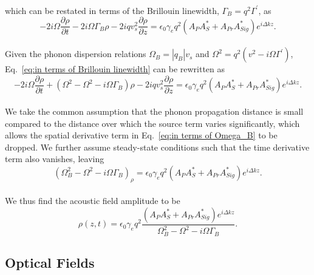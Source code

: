 \\
which can be restated in terms of the Brillouin linewidth, \(\Gamma_{B} = q^{2}\Gamma^{\prime}\), as
\\
\begin{equation}
    -2i\Omega\frac{\partial\rho}{\partial t} - 2i\Omega\Gamma_{B}\rho - 2iqv_{s}^{2}\frac{\partial\rho}{\partial z} = \epsilon_{0}\gamma_{e}q^{2}(A_{P}A_{S}^{*} + A_{Pr}A_{Sig}^{*})e^{i\Delta kz}.
    \label{eq:in terms of Brillouin linewidth}
\end{equation}
\\
Given the phonon dispersion relations \(\Omega_{B} = |q_{B}|v_{s}\) and \(\Omega^{2} = q^{2}\left(v^{2} - i\Omega\Gamma^{\prime}\right)\), Eq.~\ref{eq:in terms of Brillouin linewidth} can be rewritten as
\\
\begin{equation}
    -2i\Omega\frac{\partial\rho}{\partial t} + \left(\Omega^{2} - \Omega^{2} - i\Omega\Gamma_{B}\right)\rho - 2iqv_{s}^{2}\frac{\partial\rho}{\partial z} = \epsilon_{0}\gamma_{e}q^{2}(A_{P}A_{S}^{*} + A_{Pr}A_{Sig}^{*})e^{i\Delta kz}.
    \label{eq:in terms of Omega_B}
\end{equation}
\\
We take the common assumption that the phonon propagation distance is small compared to the distance over which the source term varies significantly, which allows the spatial derivative term in Eq.~\ref{eq:in terms of Omega_B} to be dropped. We further assume steady-state conditions such that the time derivative term also vanishes, leaving
\\
\begin{equation}
    (\Omega^{2}_{B} - \Omega^{2} - i\Omega\Gamma_{B})_{\rho} = \epsilon_{0}\gamma_{e}q^{2}(A_{P}A_{S}^{*} + A_{Pr}A_{Sig}^{*})e^{i\Delta kz}.
\end{equation}
\\
We thus find the acoustic field amplitude to be
\\
\begin{equation}
    \rho(z,t) = \epsilon_{0}\gamma_{e}q^{2}\frac{(A_{P}A_{S}^{*} + A_{Pr}A_{Sig}^{*})e^{i\Delta kz}}{\Omega_{B}^{2} - \Omega^{2} - i\Omega\Gamma_{B}}.
    \label{eq:Acoustic field amplitude}
\end{equation}


\subsection{Optical Fields}
\label{Coupled-Wave Equations:Optical Fields}

